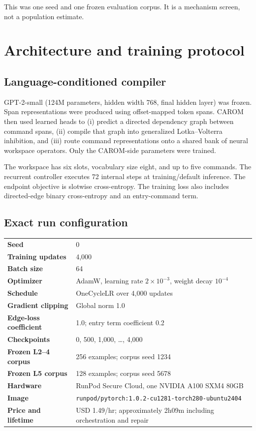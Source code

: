 \documentclass[10pt]{article}
\begin{document}
This was one seed and one frozen evaluation corpus. It is a mechanism screen,
not a population estimate.

\section{Architecture and training protocol}

\subsection{Language-conditioned compiler}

GPT-2-small (124M parameters, hidden width 768, final hidden layer) was frozen.
Span representations were produced using offset-mapped token spans. CAROM then
used learned heads to (i) predict a directed dependency graph between command
spans, (ii) compile that graph into generalized Lotka--Volterra inhibition, and
(iii) route command representations onto a shared bank of neural workspace
operators. Only the CAROM-side parameters were trained.

The workspace has six slots, vocabulary size eight, and up to five commands.
The recurrent controller executes 72 internal steps at training/default
inference. The endpoint objective is slotwise cross-entropy. The training loss
also includes directed-edge binary cross-entropy and an entry-command term.

\subsection{Exact run configuration}

\begin{tabularx}{\linewidth}{>{\bfseries}l X}
\toprule
Seed & 0 \\
Training updates & 4,000 \\
Batch size & 64 \\
Optimizer & AdamW, learning rate $2\times10^{-3}$, weight decay $10^{-4}$ \\
Schedule & OneCycleLR over 4,000 updates \\
Gradient clipping & Global norm 1.0 \\
Edge-loss coefficient & 1.0; entry term coefficient 0.2 \\
Checkpoints & 0, 500, 1,000, \ldots, 4,000 \\
Frozen L2--4 corpus & 256 examples; corpus seed 1234 \\
Frozen L5 corpus & 128 examples; corpus seed 5678 \\
Hardware & RunPod Secure Cloud, one NVIDIA A100 SXM4 80GB \\
Image & \texttt{runpod/pytorch:1.0.2-cu1281-torch280-ubuntu2404} \\
Price and lifetime & USD 1.49/hr; approximately 2h09m including orchestration and repair \\
\bottomrule
\end{tabularx}
\end{document}
